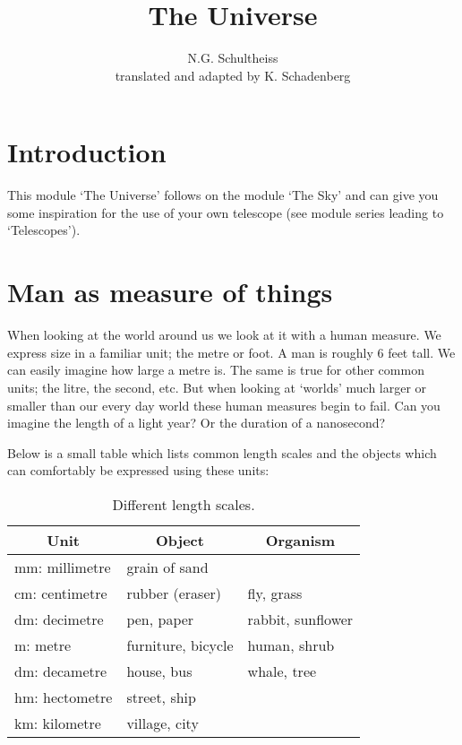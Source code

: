 


\author{N.G. Schultheiss \\ translated and adapted by K. Schadenberg}
\date{}
\title{The Universe}



\maketitle

\section{Introduction}
This module `The Universe' follows on the module `The Sky' and can give you some inspiration for the use of your own telescope (see module series leading to `Telescopes').

\section{Man as measure of things}
When looking at the world around us we look at it with a human measure. We express size in a familiar unit; the metre or foot. A man is roughly 6 feet tall. We can easily imagine how large a metre is. The same is true for other common units; the litre, the second, etc. But when looking at `worlds' much larger or smaller than our every day world these human measures begin to fail. Can you imagine the length of a light year? Or the duration of a nanosecond?

Below is a small table which lists common length scales and the objects which can comfortably be expressed  using these units:
\begin{table}[h]\begin{centering}
\begin{tabular}{|l|l|l|}
\hline \multicolumn{1}{|c|}{Unit} & \multicolumn{1}{c|}{Object} & \multicolumn{1}{c|}{Organism} \\ \hline \hline 
mm: millimetre & grain of sand &  \\ \hline
cm: centimetre & rubber (eraser) &  fly, grass \\ \hline
dm: decimetre & pen, paper & rabbit, sunflower  \\ \hline
m: metre & furniture, bicycle & human, shrub  \\ \hline
dm: decametre & house, bus & whale, tree  \\ \hline
hm: hectometre & street, ship &  \\ \hline
km: kilometre & village, city &  \\ \hline 
\end{tabular}
\caption{Different length scales.}\label{tab:length_scales}
\end{centering}\end{table}

